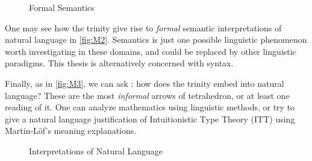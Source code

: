 \begin{figure}[H]
\centering
{}
\caption{Formal Semantics} \label{fig:M2}
\end{figure}

One may see how the trinity give rise to \emph{formal} semantic interpretations
of natural language in \autoref{fig:M2}. Semantics is just one possible
linguistic phenomenon worth investigating in these domains, and could be
replaced by other linguistic paradigms. This thesis is alternatively concerned
with syntax.

Finally, as in \autoref{fig:M3}, we can ask : how does the trinity embed into
natural language? These are the most \emph{informal} arrows of tetrahedron, or
at least one reading of it. One can analyze mathematics using linguistic
methods, or try to give a natural language justification of Intuitionistic Type
Theory (ITT) using Martin-Löf's meaning explanations.

\begin{figure}[H]
\centering
{}
\caption{Interpretations of Natural Language} \label{fig:M3}
\end{figure}

